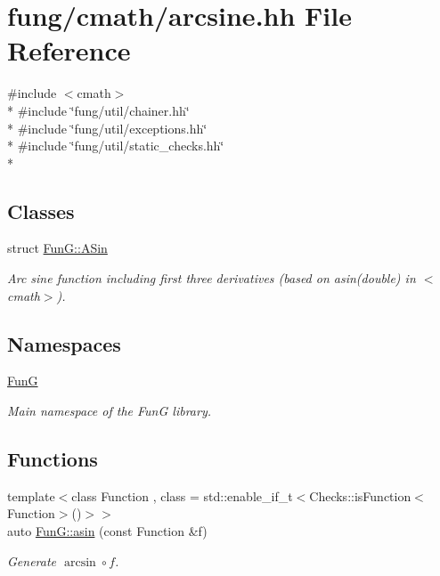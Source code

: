\hypertarget{arcsine_8hh}{}\section{fung/cmath/arcsine.hh File Reference}
\label{arcsine_8hh}
{\ttfamily \#include $<$cmath$>$}\\*
{\ttfamily \#include \char`\"{}fung/util/chainer.\+hh\char`\"{}}\\*
{\ttfamily \#include \char`\"{}fung/util/exceptions.\+hh\char`\"{}}\\*
{\ttfamily \#include \char`\"{}fung/util/static\+\_\+checks.\+hh\char`\"{}}\\*
\subsection*{Classes}
\begin{DoxyCompactItemize}
\item 
struct \hyperlink{structFunG_1_1ASin}{Fun\+G\+::\+A\+Sin}
\begin{DoxyCompactList}\small\item\em Arc sine function including first three derivatives (based on asin(double) in $<$cmath$>$). \end{DoxyCompactList}\end{DoxyCompactItemize}
\subsection*{Namespaces}
\begin{DoxyCompactItemize}
\item 
 \hyperlink{namespaceFunG}{FunG}
\begin{DoxyCompactList}\small\item\em Main namespace of the FunG library. \end{DoxyCompactList}\end{DoxyCompactItemize}
\subsection*{Functions}
\begin{DoxyCompactItemize}
\item 
{\footnotesize template$<$class Function , class  = std\+::enable\+\_\+if\+\_\+t$<$\+Checks\+::is\+Function$<$\+Function$>$()$>$$>$ }\\auto \hyperlink{group__CMathGroup_gad26443b289325876cffdaadfca770d51}{Fun\+G\+::asin} (const Function \&f)
\begin{DoxyCompactList}\small\item\em Generate $ \arcsin\circ f $. \end{DoxyCompactList}\end{DoxyCompactItemize}
